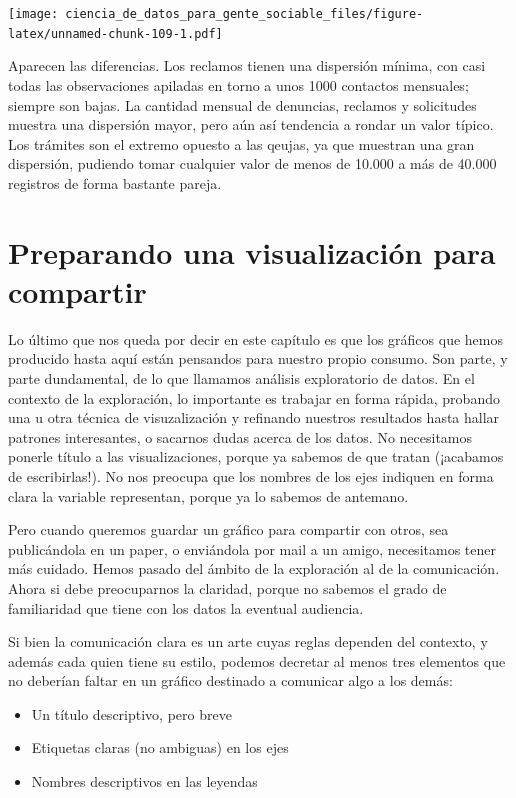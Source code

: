 \documentclass[spanish,]{book}
\providecommand{\tightlist}{%
  \setlength{\itemsep}{0pt}\setlength{\parskip}{0pt}}
\begin{document}
\texttt{[image: ciencia\_de\_datos\_para\_gente\_sociable\_files/figure-latex/unnamed-chunk-109-1.pdf]}

Aparecen las diferencias. Los reclamos tienen una dispersión mínima, con casi todas las observaciones apiladas en torno a unos 1000 contactos mensuales; siempre son bajas. La cantidad mensual de denuncias, reclamos y solicitudes muestra una dispersión mayor, pero aún así tendencia a rondar un valor típico. Los trámites son el extremo opuesto a las qeujas, ya que muestran una gran dispersión, pudiendo tomar cualquier valor de menos de 10.000 a más de 40.000 registros de forma bastante pareja.

\hypertarget{preparando-una-visualizacion-para-compartir}{%
\section{Preparando una visualización para compartir}\label{preparando-una-visualizacion-para-compartir}}

Lo último que nos queda por decir en este capítulo es que los gráficos que hemos producido hasta aquí están pensandos para nuestro propio consumo. Son parte, y parte dundamental, de lo que llamamos análisis exploratorio de datos. En el contexto de la exploración, lo importante es trabajar en forma rápida, probando una u otra técnica de visuzalización y refinando nuestros resultados hasta hallar patrones interesantes, o sacarnos dudas acerca de los datos. No necesitamos ponerle título a las visualizaciones, porque ya sabemos de que tratan (¡acabamos de escribirlas!). No nos preocupa que los nombres de los ejes indiquen en forma clara la variable representan, porque ya lo sabemos de antemano.

Pero cuando queremos guardar un gráfico para compartir con otros, sea publicándola en un paper, o enviándola por mail a un amigo, necesitamos tener más cuidado. Hemos pasado del ámbito de la exploración al de la comunicación. Ahora si debe preocuparnos la claridad, porque no sabemos el grado de familiaridad que tiene con los datos la eventual audiencia.

Si bien la comunicación clara es un arte cuyas reglas dependen del contexto, y además cada quien tiene su estilo, podemos decretar al menos tres elementos que no deberían faltar en un gráfico destinado a comunicar algo a los demás:

\begin{itemize}
\tightlist
\item
  Un título descriptivo, pero breve
\item
  Etiquetas claras (no ambiguas) en los ejes
\item
  Nombres descriptivos en las leyendas
\end{itemize}
\end{document}
